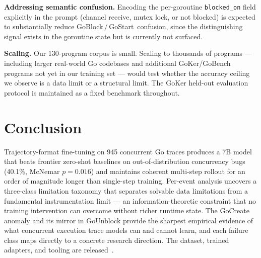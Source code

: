 \documentclass[10pt,conference]{IEEEtran}
\newcommand{\pblock}{\textsf{GoBlock}}
\newcommand{\pstart}{\textsf{GoStart}}
\begin{document}
\textbf{Addressing semantic confusion.}
Encoding the per-goroutine \texttt{blocked\_on} field explicitly in the
prompt (channel receive, mutex lock, or not blocked) is expected to
substantially reduce \pblock\,/\,\pstart\ confusion, since the
distinguishing signal exists in the goroutine state but is currently
not surfaced.

\textbf{Scaling.}
Our 130-program corpus is small.
Scaling to thousands of programs — including larger real-world Go
codebases and additional GoKer/GoBench programs not yet in our training
set — would test whether the accuracy ceiling we observe is a data
limit or a structural limit.
The GoKer held-out evaluation protocol is maintained as a fixed
benchmark throughout.

\section{Conclusion}\label{sec:conclusion}

Trajectory-format fine-tuning on 945 concurrent Go traces produces a
7B model that beats frontier zero-shot baselines on out-of-distribution
concurrency bugs (40.1\%, McNemar $p{=}0.016$) and maintains coherent
multi-step rollout for an order of magnitude longer than single-step
training.
Per-event analysis uncovers a three-class limitation taxonomy that
separates solvable data limitations from a fundamental instrumentation
limit — an information-theoretic constraint that no training
intervention can overcome without richer runtime state.
The GoCreate anomaly and its mirror in GoUnblock provide the sharpest
empirical evidence of what concurrent execution trace models can and
cannot learn, and each failure class maps directly to a concrete
research direction.
The dataset, trained adapters, and tooling are released~\cite{anon-artifacts}.



\end{document}

